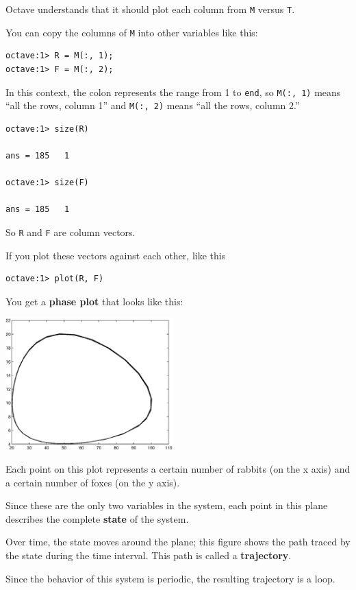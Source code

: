 \documentclass{book}
\begin{document}
Octave understands that it should plot each column from {\tt M}
versus {\tt T}.

You can copy the columns of {\tt M} into other variables like
this:

\begin{verbatim}
octave:1> R = M(:, 1);
octave:1> F = M(:, 2);
\end{verbatim}

In this context, the colon represents the range from 1 to {\tt end},
so {\tt M(:, 1)} means ``all the rows, column 1'' and
{\tt M(:, 2)} means ``all the rows, column 2.''

\begin{verbatim}
octave:1> size(R)

ans = 185   1

octave:1> size(F)

ans = 185   1
\end{verbatim}

So {\tt R} and {\tt F} are column vectors. 


If you plot these
vectors against each other, like this

\begin{verbatim}
octave:1> plot(R, F)
\end{verbatim}

You get a {\bf phase plot} that looks like this:

\beforefig \centerline{\includegraphics[height=2in]{figs/phase.eps}}

Each point on this plot represents a certain number of rabbits (on the
x axis) and a certain number of foxes (on the y axis).

Since these are the only two variables in the system, each point in
this plane describes the complete {\bf state} of the system.

Over time, the state moves around the plane; this figure shows
the path traced by the state during the time interval. This path
is called a {\bf trajectory}.

Since the behavior of this system is periodic, the resulting
trajectory is a loop.
\end{document}
